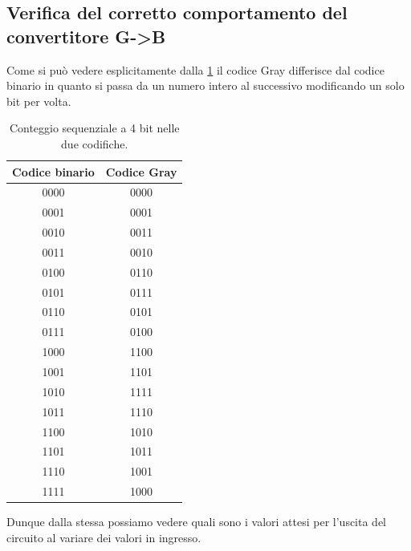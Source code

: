 \documentclass[10pt, a4paper, italian]{article}
\begin{document}
\subsection{Verifica del corretto comportamento del convertitore G->B}
Come si può vedere esplicitamente dalla \ref{tab: grbin} il codice Gray
differisce dal codice binario in quanto si passa da un numero intero al
successivo modificando un solo bit per volta.
\begin{table}[htbp]
    \centering
    \begin{tabular}{cc}
    \toprule
        Codice binario & Codice Gray \\
        \midrule
        \midrule
        0000 & 0000\\
        0001 & 0001\\
        0010 & 0011\\
        0011 & 0010\\
        0100 & 0110\\
        0101 & 0111\\
        0110 & 0101\\
        0111 & 0100\\
        1000 & 1100\\
        1001 & 1101\\
        1010 & 1111\\
        1011 & 1110\\
        1100 & 1010\\
        1101 & 1011\\
        1110 & 1001\\
        1111 & 1000\\
        \bottomrule
        \end{tabular}
    \caption{Conteggio sequenziale a 4 bit nelle due codifiche.}
    \label{tab: grbin}
\end{table}
Dunque dalla stessa possiamo vedere quali sono i valori attesi per l'uscita del
circuito al variare dei valori in ingresso.
\end{document}
